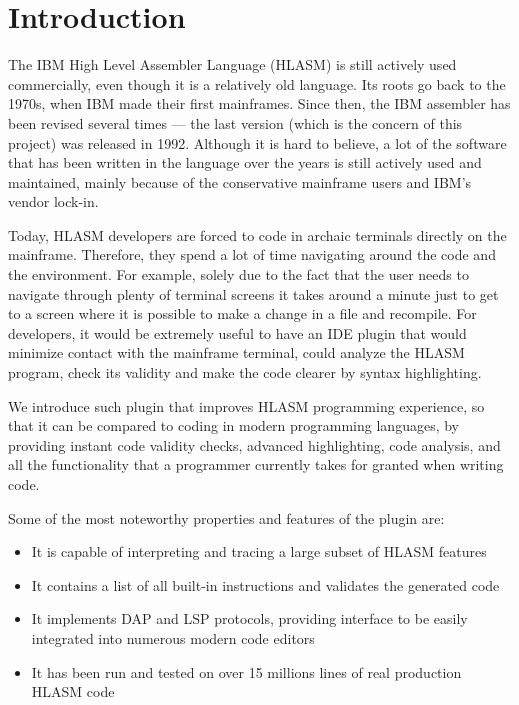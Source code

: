 \chapter{Introduction}

The IBM High Level Assembler Language (HLASM) is still actively used commercially, even though it is a relatively old language. Its roots go back to the 1970s, when IBM made their first mainframes. Since then, the IBM assembler has been revised several times --- the last version (which is the concern of this project) was released in 1992. Although it is hard to believe, a lot of the software that has been written in the language over the years is still actively used and maintained, mainly because of the conservative mainframe users and IBM's vendor lock-in.

Today, HLASM developers are forced to code in archaic terminals directly on the mainframe. Therefore, they spend a lot of time navigating around the code and the environment. For example, solely due to the fact that the user needs to navigate through plenty of terminal screens it takes around a minute just to get to a screen where it is possible to make a change in a file and recompile. For developers, it would be extremely useful to have an IDE plugin that would minimize contact with the mainframe terminal, could analyze the HLASM program, check its validity and make the code clearer by syntax highlighting. 

We introduce such plugin that improves HLASM programming experience, so that it can be compared to coding in modern programming languages, by providing instant code validity checks, advanced highlighting, code analysis, and all the functionality that a programmer currently takes for granted when writing code.

Some of the most noteworthy properties and features of the plugin are:
\begin{itemize}
	\item It is capable of interpreting and tracing a large subset of HLASM features
	\item It contains a list of all built-in instructions and validates the generated code
	\item It implements DAP and LSP protocols, providing interface to be easily integrated into numerous modern code editors
	\item It has been run and tested on over 15 millions lines of real production HLASM code
\end{itemize}

